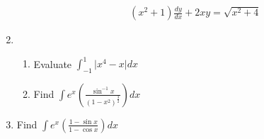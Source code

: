 \documentclass{exam}
\providecommand{\abs}[1]{\lvert#1\rvert}
\providecommand{\brak}[1]{\ensuremath{\left(#1\right)}}
\begin{document}
\begin{enumerate}
\begin{enumerate}
           \begin{align}
                \brak{x^2+1}\frac{dy}{dx}+2xy=\sqrt{x^2+4}
           \end{align}
    \end{enumerate}
    \item
    \begin{enumerate}
        \item Evaluate $\int^{1}_{-1} \abs{x^4-x}dx$
        \item Find $\int e^x\brak{\frac{\sin^{-1}x}{\brak{1-x^2}^\frac{3}{2}}}dx $
    \end{enumerate}
    \item Find $\int e^x\brak{\frac{1-\sin x}{1-\cos x}}dx$

\end{enumerate}
\end{document}
